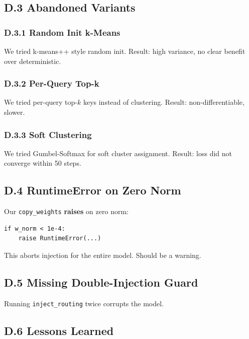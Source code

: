 \subsection{D.3 Abandoned Variants}

\subsubsection{D.3.1 Random Init k-Means}

We tried k-means++ style random init. Result: high variance, no clear 
benefit over deterministic.

\subsubsection{D.3.2 Per-Query Top-k}

We tried per-query top-$k$ keys instead of clustering. Result: non-differentiable, 
slower.

\subsubsection{D.3.3 Soft Clustering}

We tried Gumbel-Softmax for soft cluster assignment. Result: loss did not 
converge within 50 steps.

\subsection{D.4 RuntimeError on Zero Norm}

Our \texttt{copy\_weights} \textbf{raises} on zero norm:

\begin{lstlisting}
if w_norm < 1e-4:
    raise RuntimeError(...)
\end{lstlisting}

This aborts injection for the entire model. Should be a warning.

\subsection{D.5 Missing Double-Injection Guard}

Running \texttt{inject\_routing} twice corrupts the model.

\subsection{D.6 Lessons Learned}

